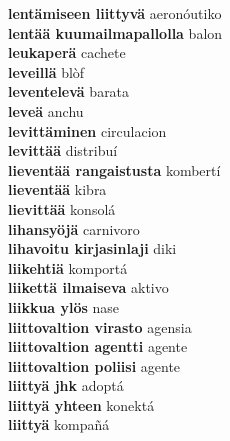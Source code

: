 \textbf{ lentämiseen liittyvä  } aeronóutiko \\
\textbf{ lentää kuumailmapallolla  } balon \\
\textbf{ leukaperä  } cachete \\
\textbf{ leveillä  } blòf \\
\textbf{ leventelevä  } barata \\
\textbf{ leveä  } anchu \\
\textbf{ levittäminen  } circulacion \\
\textbf{ levittää  } distribuí \\
\textbf{ lieventää rangaistusta  } kombertí \\
\textbf{ lieventää  } kibra \\
\textbf{ lievittää  } konsolá \\
\textbf{ lihansyöjä  } carnivoro \\
\textbf{ lihavoitu kirjasinlaji  } diki \\
\textbf{ liikehtiä  } komportá \\
\textbf{ liikettä ilmaiseva  } aktivo \\
\textbf{ liikkua ylös  } nase \\
\textbf{ liittovaltion  virasto  } agensia \\
\textbf{ liittovaltion agentti  } agente \\
\textbf{ liittovaltion poliisi  } agente \\
\textbf{ liittyä jhk  } adoptá \\
\textbf{ liittyä yhteen  } konektá \\
\textbf{ liittyä  } kompañá \\
